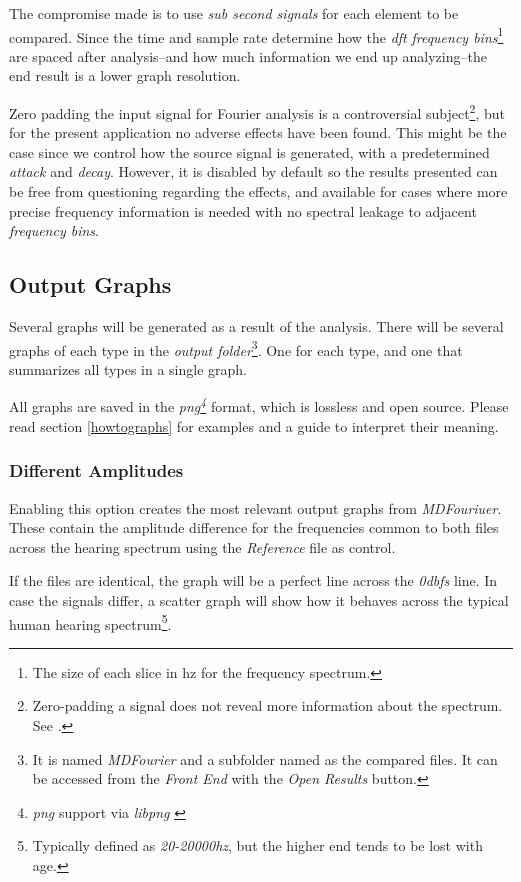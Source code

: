 \documentclass[10pt,a4paper]{report}
\newcommand{\defineCite}[2]{\textit{\acrshort{#1}\footnote{\textit{\acrlong{#1}} #2}}}
\newcommand{\ac}[1]{\textit{\acrshort{#1}}}
\newcommand{\hz}[1]{\textit{#1\acrshort{hz}}}
\newcommand{\db}[1]{\textit{#1\acrshort{dbfs}}}
\begin{document}
\begin{appendices}
The compromise made is to use \textit{sub second signals} for each element to be compared. Since the time and sample rate determine how the \ac{dft} \textit{frequency bins}\footnote{The size of each slice in \acrlong{hz} for the frequency spectrum.} are spaced after analysis--and how much information we end up analyzing--the end result is a lower graph resolution.

Zero padding the input signal for Fourier analysis is a controversial subject\footnote{Zero-padding a signal does not reveal more information about the spectrum. See \cite{zeropaddinginterpolate} \cite{ZeroPaddingBad}.}, but for the present application no adverse effects have been found. This might be the case since we control how the source signal is generated, with a predetermined \textit{attack} and \textit{decay}. However, it is disabled by default so the results presented can be free from questioning regarding the effects, and available for cases where more precise frequency information is needed with no spectral leakage to adjacent \textit{frequency bins}.

\subsection{Output Graphs}
\label{outputfiles}

Several graphs will be generated as a result of the analysis. There will be several graphs of each type in the \textit{output folder}\footnote{It is named \textit{MDFourier} and a subfolder named as the compared files. It can be accessed from the \textit{Front End} with the \textit{Open Results} button.}. One for each type, and one that summarizes all types in a single graph.

All graphs are saved in the \defineCite{png}{support via \textit{libpng} \cite{libpng}} format, which is lossless and open source. Please read section \ref{howtographs} for examples and a guide to interpret their meaning. 

\subsubsection{Different Amplitudes}

Enabling this option creates the most relevant output graphs from \textit{MDFouriuer}. These contain the amplitude difference for the frequencies common to both files across the hearing spectrum using the \textit{Reference} file as control.

If the files are identical, the graph will be a perfect line across the \db{0} line. In case the signals differ, a scatter graph will show how it behaves across the typical human hearing spectrum\footnote{Typically defined as \hz{20-20000}, but the higher end tends to be lost with age.}.


\end{appendices}
\end{document}
